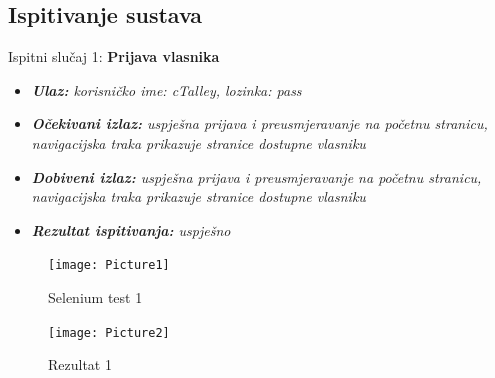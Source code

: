 			\subsection{Ispitivanje sustava}
			
			 
		 	    
		 	 

Ispitni slučaj 1: \textbf{Prijava vlasnika} 


\begin{itemize}
 	\item \textit{ \textbf{Ulaz: }korisničko ime: cTalley, lozinka: pass}
 	\item \textit{\textbf{Očekivani izlaz: }uspješna prijava i preusmjeravanje na početnu stranicu, navigacijska traka prikazuje stranice dostupne vlasniku }
 	\item \textit{\textbf{Dobiveni izlaz: }uspješna prijava i preusmjeravanje na početnu stranicu, navigacijska traka prikazuje stranice dostupne vlasniku }
 	\item \textit{\textbf{Rezultat ispitivanja: }uspješno}
 \end{itemize}
 \begin{figure}[H] 					\centering 					\texttt{[image: Picture1]}
				\caption{Selenium test 1}
				\end{figure}
\begin{figure}[H] 					\centering 					\texttt{[image: Picture2]}
				\caption{Rezultat 1}
				\end{figure}
\eject
 
